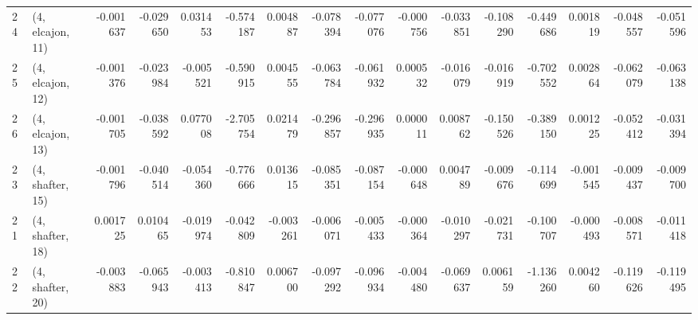 \begin{tabular}{llrrrrrrrrrrrrrr}
24 &  (4, elcajon, 11) &  -0.001637 & -0.029650 &  0.031453 &  -0.574187 &  0.004887 &  -0.078394 & -0.077076 & -0.000756 & -0.033851 & -0.108290 &  -0.449686 &  0.001819 & -0.048557 & -0.051596 \\
25 &  (4, elcajon, 12) &  -0.001376 & -0.023984 & -0.005521 &  -0.590915 &  0.004555 &  -0.063784 & -0.061932 &  0.000532 & -0.016079 & -0.016919 &  -0.702552 &  0.002864 & -0.062079 & -0.063138 \\
26 &  (4, elcajon, 13) &  -0.001705 & -0.038592 &  0.077008 &  -2.705754 &  0.021479 &  -0.296857 & -0.296935 &  0.000011 &  0.008762 & -0.150526 &  -0.389150 &  0.001225 & -0.052412 & -0.031394 \\
23 &  (4, shafter, 15) &  -0.001796 & -0.040514 & -0.054360 &  -0.776666 &  0.013615 &  -0.085351 & -0.087154 & -0.000648 &  0.004789 & -0.009676 &  -0.114699 & -0.001545 & -0.009437 & -0.009700 \\
21 &  (4, shafter, 18) &   0.001725 &  0.010465 & -0.019974 &  -0.042809 & -0.003261 &  -0.006071 & -0.005433 & -0.000364 & -0.010297 & -0.021731 &  -0.100707 & -0.000493 & -0.008571 & -0.011418 \\
22 &  (4, shafter, 20) &  -0.003883 & -0.065943 & -0.003413 &  -0.810847 &  0.006700 &  -0.097292 & -0.096934 & -0.004480 & -0.069637 &  0.006159 &  -1.136260 &  0.004260 & -0.119626 & -0.119495 \\
\bottomrule
\end{tabular}
